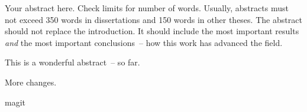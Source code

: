 Your abstract here. Check limits for number of words. Usually, abstracts must not exceed 350 words in dissertations and 150 words in other theses. The abstract should not replace the
introduction. It should include the most important
results \emph{and} the most important conclusions~-- how this work has advanced the field.

This is a wonderful abstract~-- so far.

More changes.

magit

